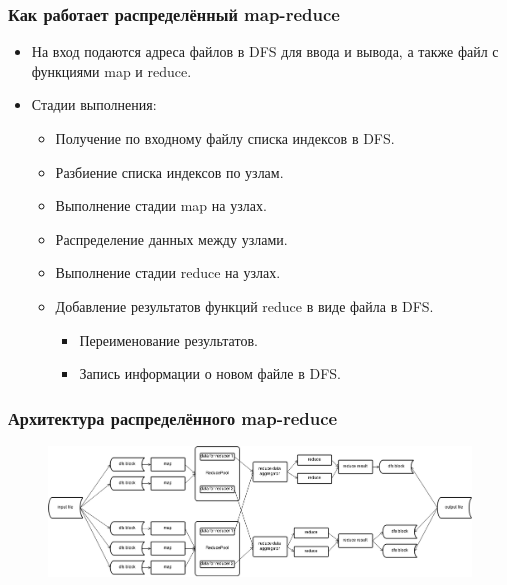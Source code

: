 \documentclass{beamer}
\begin{document}
    \begin{frame}
    \frametitle{Как работает распределённый map-reduce}
        \begin{itemize}
            \item На вход подаются адреса файлов в DFS для ввода и вывода, а также файл с функциями map и reduce.
            \item Стадии выполнения:
            \begin{itemize}
                \item Получение по входному файлу списка индексов в DFS.
                \item Разбиение списка индексов по узлам.
                \item Выполнение стадии map на узлах.
                \item Распределение данных между узлами.
                \item Выполнение стадии reduce на узлах.
                \item Добавление результатов функций reduce в виде файла в DFS.
                \begin{itemize}
                    \item Переименование результатов.
                    \item Запись информации о новом файле в DFS.
                \end{itemize} 
            \end{itemize} 
        \end{itemize}        
    \end{frame}

    \begin{frame}
    \frametitle{Архитектура распределённого map-reduce}
        \begin{figure}[h!]
            \begin{center}
                \includegraphics[scale=1]{total_data.png}
            \end{center}
        \end{figure}        
    \end{frame}
\end{document}
